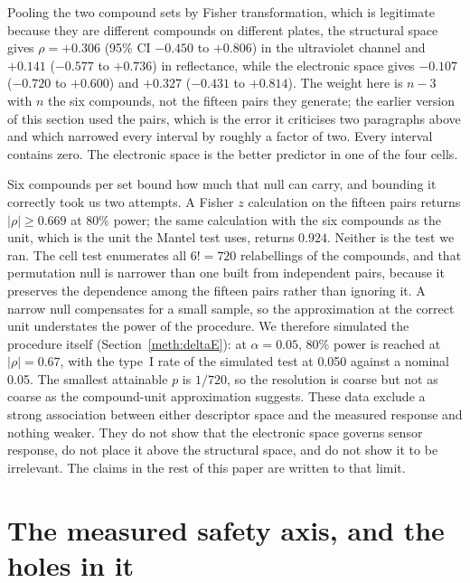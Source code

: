 \documentclass[11pt,a4paper]{article}
\begin{document}
Pooling the two compound sets by Fisher transformation, which is legitimate
because they are different compounds on different plates, the structural space
gives $\rho = +0.306$ (95\% CI $-0.450$ to $+0.806$) in the ultraviolet channel
and $+0.141$ ($-0.577$ to $+0.736$) in reflectance, while the electronic space
gives $-0.107$ ($-0.720$ to $+0.600$) and $+0.327$ ($-0.431$ to $+0.814$). The
weight here is $n-3$ with $n$ the six compounds, not the fifteen pairs they
generate; the earlier version of this section used the pairs, which is the error
it criticises two paragraphs above and which narrowed every interval by roughly
a factor of two. Every interval contains zero. The electronic space is the
better predictor in one of the four cells.

Six compounds per set bound how much that null can carry, and bounding it
correctly took us two attempts. A Fisher $z$ calculation on the fifteen pairs
returns $|\rho| \ge 0.669$ at 80\% power; the same calculation with the six
compounds as the unit, which is the unit the Mantel test uses, returns $0.924$.
Neither is the test we ran. The cell test enumerates all $6! = 720$ relabellings
of the compounds, and that permutation null is narrower than one built from
independent pairs, because it preserves the dependence among the fifteen pairs
rather than ignoring it. A narrow null compensates for a small sample, so the
approximation at the correct unit understates the power of the procedure. We
therefore simulated the procedure itself (Section~\ref{meth:deltaE}): at
$\alpha = 0.05$, 80\% power is reached at $|\rho| = 0.67$, with the type~I rate
of the simulated test at 0.050 against a nominal 0.05. The smallest attainable
$p$ is $1/720$, so the resolution is coarse but not as coarse as the
compound-unit approximation suggests. These data exclude a strong association
between either descriptor space and the measured response and nothing weaker. They do not show that the
electronic space governs sensor response, do not place it above the structural
space, and do not show it to be irrelevant. The claims in the rest of this paper
are written to that limit.

\section{The measured safety axis, and the holes in it}
\label{res:safety}
\end{document}
